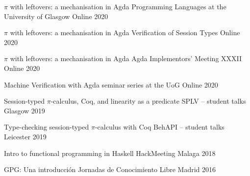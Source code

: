 \documentclass[11pt, a4paper]{awesome-cv}
\begin{document}
\begin{cvhonors}
  \cvhonor
  {$\pi$ with leftovers: a mechanisation in Agda}
  {Programming Languages at the University of Glasgow}
  {Online}
  {2020}

  \cvhonor
  {$\pi$ with leftovers: a mechanisation in Agda}
  {Verification of Session Types}
  {Online}
  {2020}

  \cvhonor
  {$\pi$ with leftovers: a mechanisation in Agda}
  {Agda Implementors' Meeting XXXII}
  {Online}
  {2020}

  \cvhonor
  {Machine Verification with Agda}
  {seminar series at the UoG}
  {Online}
  {2020}

    \cvhonor
      {Session-typed $\pi$-calculus, Coq, and linearity as a predicate}
      {SPLV -- student talks}
      {Glasgow} %
      {2019} %

    \cvhonor
      {Type-checking session-typed $\pi$-calculus with Coq}
      {BehAPI -- student talks}
      {Leicester} %
      {2019} %

    \cvhonor
      {Intro to functional programming in Haskell}
      {HackMeeting}
      {Malaga} %
      {2018} %

    \cvhonor
      {GPG: Una introducción}
      {Jornadas de Conocimiento Libre}
      {Madrid} %
      {2016} %
\end{cvhonors}

\end{document}
